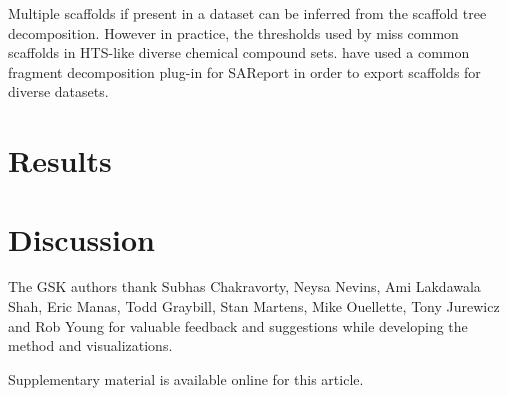 \documentclass[journal=jacsat,manuscript=article]{achemso}
\begin{document}
Multiple scaffolds if present in a dataset can be inferred from the scaffold tree decomposition\cite{ClarkLabute2008SAReport}. However in practice, the thresholds used by \citeauthor{ClarkLabute2008SAReport} miss common scaffolds in HTS-like diverse chemical compound sets. \citeauthor{Bandyopadhyay2011ACS} have used a common fragment decomposition plug-in for SAReport in order to export scaffolds for diverse datasets.   

\section{Results}

\section{Discussion}
\label{sec:discussion}



\begin{acknowledgement}
  The GSK authors thank Subhas Chakravorty, Neysa Nevins, Ami Lakdawala Shah,
  Eric Manas, Todd Graybill, Stan Martens, Mike Ouellette, Tony Jurewicz and Rob
  Young for valuable feedback and suggestions while developing the method and
  visualizations.
\end{acknowledgement}

\begin{suppinfo}
Supplementary material is available online for this article.
\end{suppinfo}


\end{document}
